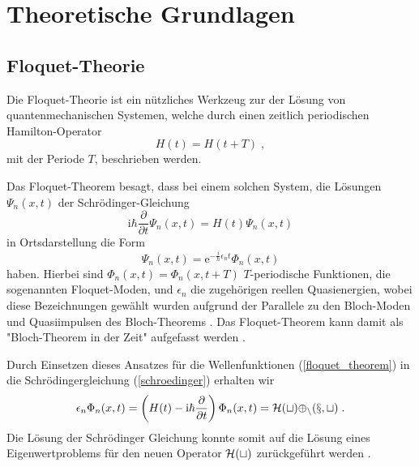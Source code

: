 \chapter{Theoretische Grundlagen}


\section{Floquet-Theorie}
  Die Floquet-Theorie ist ein nützliches Werkzeug zur der Lösung von quantenmechanischen Systemen, welche durch einen zeitlich periodischen Hamilton-Operator
  \begin{equation}
    H(t) = H(t+T) \; ,
  \end{equation}
  mit der Periode $T$, beschrieben werden.

  Das Floquet-Theorem besagt, dass bei einem solchen System, die Lösungen $\Psi_n(x,t)$ der Schrödinger-Gleichung
  \begin{equation}
    \text{i}\hbar\frac{\partial}{\partial t}\Psi_n(x,t) = H(t)\Psi_n(x,t)
    \label{schroedinger}
  \end{equation}
  in Ortsdarstellung die Form
  \begin{equation}
    \Psi_n(x,t) = \text{e}^{-\frac{i}{\hbar}\epsilon_nt}\Phi_n(x,t)
    \label{floquet_theorem}
  \end{equation}
  haben.
  Hierbei sind $\Phi_n(x,t) = \Phi_n(x,t+T)$ $T$-periodische Funktionen, die sogenannten Floquet-Moden, und $\epsilon_n$ die zugehörigen reellen Quasienergien, wobei diese Bezeichnungen gewählt wurden aufgrund der Parallele zu den Bloch-Moden und Quasiimpulsen des Bloch-Theorems \cite{haengi}.
  Das Floquet-Theorem kann damit als "Bloch-Theorem in der Zeit" aufgefasst werden \cite{sherly}.

  Durch Einsetzen dieses Ansatzes für die Wellenfunktionen (\ref{floquet_theorem}) in die Schrödingergleichung (\ref{schroedinger}) erhalten wir
  \begin{equation}
    \epsilon_n \Phi_n(x,t) = \left(H(t)-\text{i}\hbar\frac{\partial}{\partial t}\right)\Phi_n(x,t) = \cal{H}(t) \Phi_n(x,t) \; .
    \label{eigenwertproblem}
  \end{equation}
  Die Lösung der Schrödinger Gleichung konnte somit auf die Lösung eines Eigenwertproblems für den neuen Operator $\cal{H}(t)$ zurückgeführt werden \cite{sherly}.

